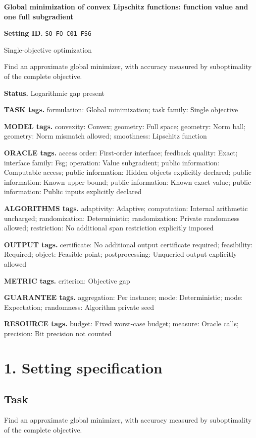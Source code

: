 \documentclass[10pt,a4paper]{article}
\begin{document}
\raggedright

{\LARGE\bfseries\sffamily\color{AtlasNavy} Global minimization of convex Lipschitz functions: function value and one full subgradient\par}\vspace{5pt}
\textbf{Setting ID.} \texttt{SO\_\allowbreak{}FO\_\allowbreak{}C01\_\allowbreak{}FSG}

Single-objective optimization

Find an approximate global minimizer, with accuracy measured by suboptimality of the complete objective.

\textbf{Status.} Logarithmic gap present

\textbf{TASK tags.} formulation: Global minimization; task family: Single objective

\textbf{MODEL tags.} convexity: Convex; geometry: Full space; geometry: Norm ball; geometry: Norm mismatch allowed; smoothness: Lipschitz function

\textbf{ORACLE tags.} access order: First-order interface; feedback quality: Exact; interface family: Fsg; operation: Value subgradient; public information: Computable access; public information: Hidden objects explicitly declared; public information: Known upper bound; public information: Known exact value; public information: Public inputs explicitly declared

\textbf{ALGORITHMS tags.} adaptivity: Adaptive; computation: Internal arithmetic uncharged; randomization: Deterministic; randomization: Private randomness allowed; restriction: No additional span restriction explicitly imposed

\textbf{OUTPUT tags.} certificate: No additional output certificate required; feasibility: Required; object: Feasible point; postprocessing: Unqueried output explicitly allowed

\textbf{METRIC tags.} criterion: Objective gap

\textbf{GUARANTEE tags.} aggregation: Per instance; mode: Deterministic; mode: Expectation; randomness: Algorithm private seed

\textbf{RESOURCE tags.} budget: Fixed worst-case budget; measure: Oracle calls; precision: Bit precision not counted

\section{1. Setting specification}
\subsection{Task}
Find an approximate global minimizer, with accuracy measured by suboptimality of the complete objective.
\end{document}
